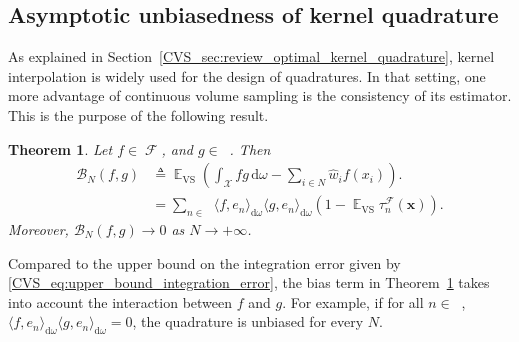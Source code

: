 \documentclass[twoside,11pt]{book}
\newtheorem{theorem}{Theorem}
\numberwithin{theorem}{chapter}
\numberwithin{definition}{chapter}
\numberwithin{proposition}{chapter}
\numberwithin{corollary}{chapter}
\numberwithin{example}{chapter}
\numberwithin{lemma}{chapter}
\DeclareMathOperator{\VS}{\mathrm{VS}}
\DeclareMathOperator{\EX}{\mathbb{E}}
\DeclareMathOperator{\F}{\mathcal{F}}
\DeclareMathOperator{\X}{\mathcal{X}}
\DeclareMathOperator{\Ltwo}{\mathbb{L}_{2}(\mathrm{d} \omega)}
\DeclareMathOperator{\Ns}{\mathbb{N}^{*}}
\newcommand{\pc}[1]{\textcolor{blue}{#1}}
\begin{document}
\subsection{Asymptotic unbiasedness of kernel quadrature}\label{CVS_sec:unbiased_property}
As explained in Section~\ref{CVS_sec:review_optimal_kernel_quadrature}, kernel interpolation is widely used for the design of quadratures.
In that setting, one more advantage of continuous volume sampling is the consistency of its estimator. This is the purpose of the following result.
 \begin{theorem}\label{CVS_thm:EX_VS_integration_error}
Let $f \in \F$, and $g \in \Ltwo$. Then
\begin{align}
\mathcal{B}_{N}(f,g) & \triangleq \EX_{\VS} \left( \int_{\X}fg\,\mathrm{d}\omega -  \sum\limits_{i \in N} \hat{w}_{i}f(x_{i}) \right). \nonumber\\
 & = \sum\limits_{n \in \Ns} \langle f,e_{n} \rangle_{\mathrm{d}\omega} \langle g,e_{n} \rangle_{\mathrm{d}\omega}\left(1- \EX_{\VS}\tau_{n}^{\F}(\bm{x}) \right) . \nonumber%
\end{align}
Moreover,
$\mathcal{B}_{N}(f,g) \rightarrow 0$ as $N \rightarrow +\infty$.
\end{theorem}
Compared to the upper bound on the integration error given by \eqref{CVS_eq:upper_bound_integration_error}, the bias term in Theorem~\ref{CVS_thm:EX_VS_integration_error} takes into account the interaction between $f$ and $g$. For example, if for all $n \in \Ns$, $\langle f,e_{n} \rangle_{\mathrm{d}\omega} \langle g,e_{n} \rangle_{\mathrm{d}\omega} = 0$, the quadrature is unbiased for every $N$.
\end{document}
